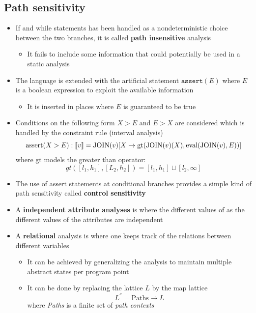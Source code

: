 \subsection{Path sensitivity}
\begin{itemize}
  \item If and while statements has been handled as a nondeterministic choice between the two branches, it is called \textbf{path insensitive} analysis
  \begin{itemize}
  	\item It fails to include some information that could potentially be used in a static analysis 
  \end{itemize}
  \item The language is extended with the artificial statement $\mathtt{assert}(E)$ where $E$ is a boolean expression to exploit the available information
  \begin{itemize}
  	\item It is inserted in places where $E$ is guaranteed to be true
  \end{itemize}
	\item Conditions on the following form $X > E$ and $E > X$ are considered which is handled by the constraint rule (interval analysis)
  \begin{equation*}
    \text{assert}(X > E): \left\llbracket v\right\rrbracket = \text{JOIN}(v)[X \mapsto \text{gt}(\text{JOIN}(v)(X), \text{eval}(\text{JOIN}(v),E))]
  \end{equation*}
  where gt models the greater than operator:
  \begin{equation*}
    gt([l_1,h_1],[L_2,h_2]) = [l_1, h_1] \sqcup [l_2, \infty]
  \end{equation*}
  \item The use of assert statements at conditional branches provides a simple kind of path sensitivity called \textbf{control sensitivity}  
  \item A \textbf{independent attribute analyses} is where the different values of as the different values of the attributes are independent
  \item A \textbf{relational} analysis is where one keeps track of the relations between different variables
  \begin{itemize}
  	\item It can be achieved by generalizing the analysis to maintain multiple abstract states per program point
  	\item It can be done by replacing the lattice $L$ by the map lattice
  \begin{equation*}
    L^{''} = \text{Paths} \rightarrow L
  \end{equation*}
  where \textit{Paths} is a finite set of \textit{path contexts} 
  \end{itemize}
\end{itemize}

\newpage
